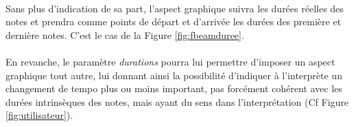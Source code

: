 \documentclass[a4paper,10pt,twocolumn]{article}
\newenvironment{code}
  {\fontfamily{pnc}\selectfont}{}
\begin{document}
\paragraph{}
Sans plus d'indication de sa part, l'aspect graphique suivra les durées réelles des notes et prendra comme points de départ et d'arrivée les durées des première et dernière notes.  C'est le cas de la Figure \ref{fig:fbeamduree}.

\paragraph{}
En revanche, le paramètre \textit{durations} pourra lui permettre d'imposer un aspect graphique tout autre, lui donnant ainsi la possibilité d'indiquer à l'interprète un changement de tempo plus ou moins important, pas forcément cohérent avec les durées intrinsèques des notes, mais ayant du sens dans l'interprétation (Cf Figure \ref{fig:utilisateur}).

\end{document}
